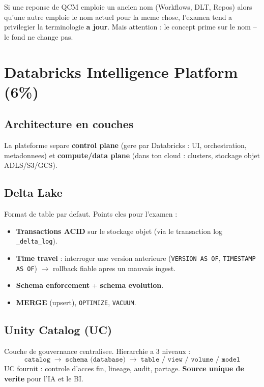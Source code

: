 \documentclass[11pt,a4paper]{article}
\begin{document}
\begin{cle}
Si une reponse de QCM emploie un ancien nom (Workflows, DLT, Repos) alors qu'une autre
emploie le nom actuel pour la meme chose, l'examen tend a privilegier la terminologie
\textbf{a jour}. Mais attention : le concept prime sur le nom -- le fond ne change pas.
\end{cle}

\section{Databricks Intelligence Platform (6\%)}

\subsection{Architecture en couches}

La plateforme separe \textbf{control plane} (gere par Databricks : UI, orchestration,
metadonnees) et \textbf{compute/data plane} (dans ton cloud : clusters, stockage objet
ADLS/S3/GCS).

\subsection{Delta Lake}

Format de table par defaut. Points cles pour l'examen :
\begin{itemize}[leftmargin=*,nosep]
  \item \textbf{Transactions ACID} sur le stockage objet (via le transaction log \texttt{\_delta\_log}).
  \item \textbf{Time travel} : interroger une version anterieure (\texttt{VERSION AS OF}, \texttt{TIMESTAMP AS OF}) $\rightarrow$ rollback fiable apres un mauvais ingest.
  \item \textbf{Schema enforcement} + \textbf{schema evolution}.
  \item \textbf{MERGE} (upsert), \texttt{OPTIMIZE}, \texttt{VACUUM}.
\end{itemize}

\subsection{Unity Catalog (UC)}

Couche de gouvernance centralisee. Hierarchie a 3 niveaux :
\[
\texttt{catalog} \;\rightarrow\; \texttt{schema (database)} \;\rightarrow\; \texttt{table / view / volume / model}
\]
UC fournit : controle d'acces fin, lineage, audit, partage. \textbf{Source unique de verite}
pour l'IA et le BI.
\end{document}
